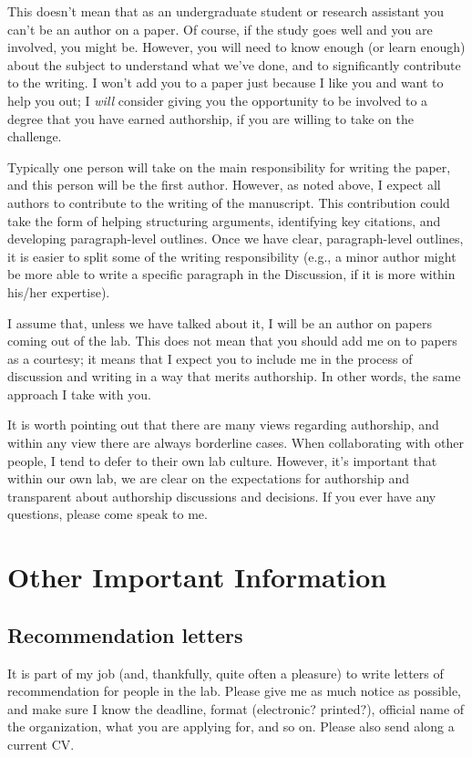\documentclass[letterpaper,12pt,oneside]{memoir}
\begin{document}
This doesn't mean that as an undergraduate student or research assistant you can't be an author on a paper. Of course, if the study goes well and you are involved, you might be. However, you will need to know enough (or learn enough) about the subject to understand what we've done, and to significantly contribute to the writing. I won't add you to a paper just because I like you and want to help you out; I {\itshape will} consider giving you the opportunity to be involved to a degree that you have earned authorship, if you are willing to take on the challenge.

Typically one person will take on the main responsibility for writing the paper, and this person will be the first author. However, as noted above, I expect all authors to contribute to the writing of the manuscript. This contribution could take the form of helping structuring arguments, identifying key citations, and developing paragraph-level outlines. Once we have clear, paragraph-level outlines, it is easier to split some of the writing responsibility (e.g., a minor author might be more able to write a specific paragraph in the Discussion, if it is more within his/her expertise).

I assume that, unless we have talked about it, I will be an author on papers coming out of the lab. This does not mean that you should add me on to papers as a courtesy; it means that I expect you to include me in the process of discussion and writing in a way that merits authorship. In other words, the same approach I take with you.

It is worth pointing out that there are many views regarding authorship, and within any view there are always borderline cases. When collaborating with other people, I tend to defer to their own lab culture. However, it's important that within our own lab, we are clear on the expectations for authorship and transparent about authorship discussions and decisions. If you ever have any questions, please come speak to me.


\chapter{Other Important Information}
\section{Recommendation letters}
It is part of my job (and, thankfully, quite often a pleasure) to write letters of recommendation for people in the lab. Please give me as much notice as possible, and make sure I know the deadline, format (electronic? printed?), official name of the organization, what you are applying for, and so on. Please also send along a current CV.
\end{document}
